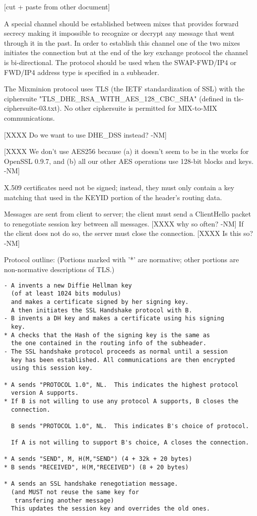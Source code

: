 [cut + paste from other document]

A special channel should be established between mixes that provides
forward secrecy making it impossible to recognize or decrypt any
message that went through it in the past. In order to establish this
channel one of the two mixes initiates the connection but at the end
of the key exchange protocol the channel is bi-directional. The
protocol should be used when the SWAP-FWD/IP4 or FWD/IP4 address type
is specified in a subheader.

The Mixminion protocol uses TLS (the IETF standardization of SSL) with
the ciphersuite "TLS_DHE_RSA_WITH_AES_128_CBC_SHA" (defined in
tls-ciphersuite-03.txt).  No other ciphersuite is permitted for
MIX-to-MIX communications.

  [XXXX Do we want to use DHE_DSS instead? -NM]

  [XXXX We don't use AES256 because (a) it doesn't seem to be in
        the works for OpenSSL 0.9.7, and (b) all our other AES
        operations use 128-bit blocks and keys. -NM]

X.509 certificates need not be signed; instead, they must only contain
a key matching that used in the KEYID portion of the header's routing
data.  

Messages are sent from client to server; the client must send a
ClientHello packet to renegotiate session key between all
messages. [XXXX why so often? -NM] If the client does not do so, the
server must close the connection.  [XXXX Is this so? -NM]

Protocol outline: (Portions marked with '*' are normative; other
portions are non-normative descriptions of TLS.)

\begin{verbatim}
- A invents a new Diffie Hellman key 
  (of at least 1024 bits modulus)
  and makes a certificate signed by her signing key.
  A then initiates the SSL Handshake protocol with B.
- B invents a DH key and makes a certificate using his signing
  key.
* A checks that the Hash of the signing key is the same as
  the one contained in the routing info of the subheader.
- The SSL handshake protocol proceeds as normal until a session
  key has been established. All communications are then encrypted
  using this session key.

* A sends "PROTOCOL 1.0", NL.  This indicates the highest protocol
  version A supports.
* If B is not willing to use any protocol A supports, B closes the 
  connection.

  B sends "PROTOCOL 1.0", NL.  This indicates B's choice of protocol.

  If A is not willing to support B's choice, A closes the connection.
  
* A sends "SEND", M, H(M,"SEND") (4 + 32k + 20 bytes)
* B sends "RECEIVED", H(M,"RECEIVED") (8 + 20 bytes)

* A sends an SSL handshake renegotiation message.
  (and MUST not reuse the same key for 
   transfering another message)
  This updates the session key and overrides the old ones.
\end{verbatim}

